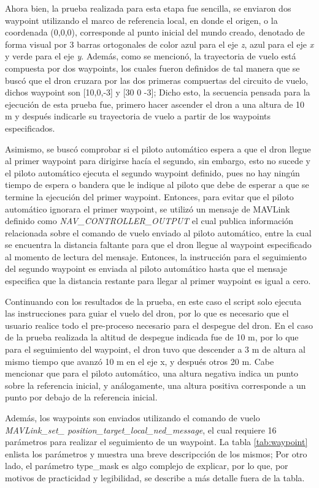 Ahora bien, la prueba realizada para esta etapa fue sencilla, se enviaron dos waypoint utilizando el marco de referencia local, en donde el origen, o la coordenada (0,0,0), corresponde al punto inicial del mundo creado, denotado de forma visual por 3 barras ortogonales de color azul para el eje \textit{z}, azul para el eje \textit{x} y verde para el eje \textit{y}. Además, como se mencionó, la trayectoria de vuelo está compuesta por dos waypoints, los cuales fueron definidos de tal manera que se buscó que el dron cruzara por las dos primeras compuertas del circuito de vuelo, dichos waypoint son [10,0,-3] y [30 0 -3]; Dicho esto, la secuencia pensada para la ejecución de esta prueba fue, primero hacer ascender el dron a una altura de 10 m y después indicarle su trayectoria de vuelo a partir de los waypoints especificados. 

Asimismo, se buscó comprobar si el piloto automático espera a que el dron llegue al primer waypoint para dirigirse hacía el segundo, sin embargo, esto no sucede y el piloto automático ejecuta el segundo waypoint definido, pues no hay ningún tiempo de espera o bandera que le indique al piloto que debe de esperar a que se termine la ejecución del primer waypoint. Entonces, para evitar que el piloto automático ignorara el primer waypoint, se utilizó un mensaje de MAVLink definido como \textit{NAV\_CONTROLLER\_OUTPUT} el cual publica información relacionada sobre el comando de vuelo enviado al piloto automático, entre la cual se encuentra la distancia faltante para que el dron llegue al waypoint especificado al momento de lectura del mensaje. Entonces, la instrucción para el seguimiento del segundo waypoint es enviada al piloto automático hasta que el mensaje especifica que la distancia restante para llegar al primer waypoint es igual a cero.

Continuando con los resultados de la prueba, en este caso el script solo ejecuta las instrucciones para guiar el vuelo del dron, por lo que es necesario que el usuario realice todo el pre-proceso necesario para el despegue del dron. En el caso de la prueba realizada la altitud de despegue indicada fue de 10 m, por lo que para el seguimiento del waypoint, el dron tuvo que descender a 3 m de altura al mismo tiempo que avanzó 10 m en el eje x, y después otros 20 m. Cabe mencionar que para el piloto automático, una altura negativa indica un punto sobre la referencia inicial, y análogamente, una altura positiva corresponde a un punto por debajo de la referencia inicial. 

Además, los waypoints son enviados utilizando el comando de vuelo \textit{MAVLink\_set\_ position\_target\_local\_ned\_message}, el cual requiere 16 parámetros para realizar el seguimiento de un waypoint. La tabla \ref{tab:waypoint} enlista los parámetros y muestra una breve descripcción de los mismos; Por otro lado, el parámetro type\_mask  es algo complejo de explicar, por lo que, por motivos de practicidad y legibilidad, se describe a más detalle fuera de la tabla.

